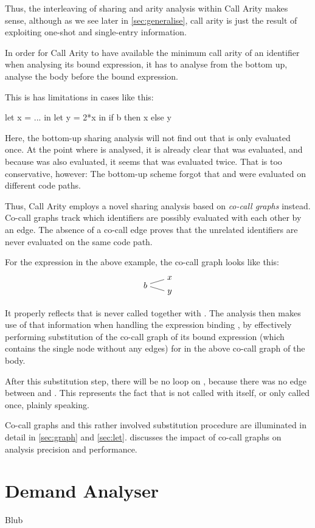 Thus, the interleaving of sharing and arity analysis within Call Arity makes sense, although as we see later in \cref{sec:generalise}, call arity is just the result of exploiting one-shot and single-entry information.\smallskip

In order for Call Arity to have available the minimum call arity of an identifier when analysing its bound expression, it has to analyse  from the bottom up, \eg analyse the body before the bound expression.

This is has limitations in cases like this:
\begin{haskellcode}
  let x = ...
  in let y = 2*x
     in if b
        then x
        else y
\end{haskellcode}

Here, the bottom-up sharing analysis will not find out that  is only evaluated once. 
At the point where  is analysed, it is already clear that  was evaluated, and because  was also evaluated, it seems that  was evaluated twice.
That is too conservative, however: The bottom-up scheme forgot that  and  were evaluated on different code paths.

Thus, Call Arity employs a novel sharing analysis based on \emph{co-call graphs} instead.
Co-call graphs track which identifiers are possibly evaluated with each other by an edge.
The absence of a co-call edge proves that the unrelated identifiers are never evaluated on the same code path.

For the  expression in the above example, the co-call graph looks like this:
\[  
  \begin{tikzpicture}[baseline={(0.base)}]
    \node (0) {$b$};
    \node at (1,0.3) (1) {$x$};
    \node at (1,-0.3) (2) {$y$};
    \draw (0) -- (1);
    \draw (0) -- (2);
  \end{tikzpicture}
\]

It properly reflects that  is never called together with .
The analysis then makes use of that information when handling the  expression binding , by effectively performing substitution of the co-call graph of its bound expression (which contains the single node  without any edges) for  in the above co-call graph of the body.

After this substitution step, there will be no loop on , because there was no edge between  and .
This represents the fact that  is not called with itself, or only called once, plainly speaking.

Co-call graphs and this rather involved substitution procedure are illuminated in detail in \cref{sec:graph} and \cref{sec:let}.
 discusses the impact of co-call graphs on analysis precision and performance.

\section{Demand Analyser}\label{sec:dmd}

Blub

